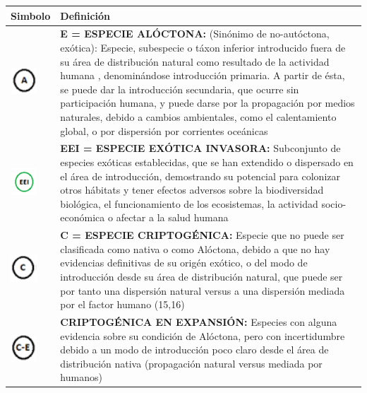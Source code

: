 \documentclass{article}
\begin{document}
\begin{table}[H]
\begin{center}
\begin{tabular}{ >{\centering\arraybackslash}m{2cm} >{\arraybackslash}m{12cm}}
\hline
\rowcolor{green!70!yellow!40}
Simbolo& Definición\\
\hline
\centering\includegraphics[width=1cm, height=1cm]{./images/a.png} & \textbf{E = ESPECIE ALÓCTONA:} (Sinónimo de no-autóctona, exótica): Especie, subespecie o táxon inferior introducido fuera de su área de distribución natural como resultado de la actividad humana \cite{8,9}, denominándose introducción primaria. A partir de ésta, se puede dar la introducción secundaria, que ocurre sin participación humana, y puede darse por la  propagación por medios naturales, debido a cambios ambientales, como el calentamiento global, o por dispersión por corrientes oceánicas \cite{9, 10}\\
\centering\includegraphics[width=1cm, height=1cm]{./images/EEI.png} & \textbf{EEI = ESPECIE EXÓTICA INVASORA:} Subconjunto de especies exóticas establecidas, que se han extendido o dispersado en el área de introducción, demostrando su potencial para colonizar otros hábitats y tener efectos adversos sobre la biodiversidad biológica, el funcionamiento de los ecosistemas, la actividad socio-económica o afectar a la salud humana \cite{11,12,13,14}\\
\centering\includegraphics[width=1cm, height=1cm]{./images/C.png} &\textbf{C = ESPECIE CRIPTOGÉNICA:}  Especie que no puede ser clasificada como nativa o como Alóctona, debido a  que no hay evidencias definitivas de su origén exótico, o del modo de introducción desde su área de distribución natural, que puede ser por  tanto una dispersión natural versus a una dispersión mediada por el factor humano (15,16)\\
\centering\includegraphics[width=1cm, height=1cm]{./images/CE.png} &\textbf{CRIPTOGÉNICA EN EXPANSIÓN:} Especies con alguna evidencia sobre su condición de Alóctona, pero con incertidumbre debido a un modo de introducción poco claro desde el área de distribución nativa (propagación natural versus mediada por humanos)  \cite{15,16}\\

\end{tabular}
\end{center}
\end{table}
\end{document}

